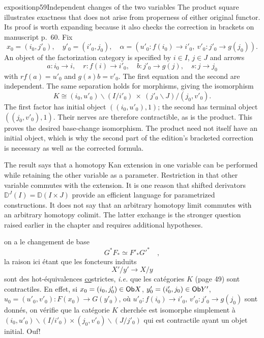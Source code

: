\begin{dcomment}{exposition}{p59}{Independent changes of the two variables}
The product square illustrates exactness that does not arise from properness of either original functor. Its proof is worth expanding because it also checks the correction in brackets on manuscript p.~60. Fix
\[
 x_0=(i_0,j'_0),\quad y'_0=(i'_0,j_0),\quad
 \alpha=(u'_0:f(i_0)\to i'_0,\ v'_0:j'_0\to g(j_0)).
\]
An object of the factorization category is specified by $i\in I$, $j\in J$ and arrows
\[
 a:i_0\to i,\quad r:f(i)\to i'_0,\quad
 b:j'_0\to g(j),\quad s:j\to j_0
\]
with $r f(a)=u'_0$ and $g(s)b=v'_0$. The first equation and the second are independent. The same separation holds for morphisms, giving the isomorphism
\[
 K\cong
 (i_0,u'_0)\backslash(I/i'_0)
 \ \times\ 
 (j'_0\backslash J)/(j_0,v'_0).
\]
The first factor has initial object $((i_0,u'_0),1)$; the second has terminal object $((j_0,v'_0),1)$. Their nerves are therefore contractible, as is the product. This proves the desired base-change isomorphism. The product need not itself have an initial object, which is why the second part of the edition's bracketed correction is necessary as well as the corrected formula.

The result says that a homotopy Kan extension in one variable can be performed while retaining the other variable as a parameter. Restriction in that other variable commutes with the extension. It is one reason that shifted derivators $\mathbb D^J(I)=\mathbb D(I\times J)$ provide an efficient language for parametrized constructions. It does not say that an arbitrary homotopy limit commutes with an arbitrary homotopy colimit. The latter exchange is the stronger question raised earlier in the chapter and requires additional hypotheses.
\end{dcomment}


\noindent on a le changement de base
\[
G^*F_* \simeq F'_*{G'}^* \quad ,
\]
la raison ici étant que les foncteurs induits
\[
X'/y' \longrightarrow X/y
\]
sont des hot-équivalences \underline{\underline{co}}strictes, \textit{i.e.} que les catégories $K$ (page 49) sont contractiles. En effet, si $x_0 = (i_0, j'_0) \in \mathsf{Ob} X$, $y'_0 = (i'_0, j_0) \in \mathsf{Ob} Y'$, $u_0 = (u'_0, v'_0) : F(x_0) \to G(y'_0)$, où $u'_0 : f(i_0) \to i'_0$, $v'_0 : j'_0 \to g(j_0)$ sont donnés, on vérifie que la catégorie $K$ cherchée est isomorphe simplement à $(i_0, u'_0)\backslash(I/i'_0) \times (j_0, v'_0)\backslash(J/j'_0)$ qui est contractile ayant un objet initial. Ouf!

